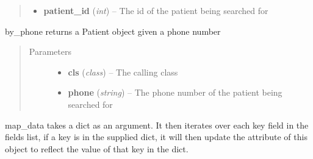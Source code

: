 \documentclass[letterpaper,10pt,english]{sphinxmanual}
\begin{document}
\begin{fulllineitems}
\begin{fulllineitems}
\begin{quote}
\begin{description}
\begin{itemize}
\item {} 
\textbf{patient\_id} (\emph{int}) -- The id of the patient being searched for

\end{itemize}

\end{description}\end{quote}

\end{fulllineitems}


\begin{fulllineitems}
\label{dev-patients:cagenix.patients.models.Patient.by_phone}
by\_phone returns a Patient object given a phone number
\begin{quote}\begin{description}
\item[{Parameters}] \leavevmode\begin{itemize}
\item {} 
\textbf{cls} (\emph{class}) -- The calling class

\item {} 
\textbf{phone} (\emph{string}) -- The phone number of the patient being searched for

\end{itemize}

\end{description}\end{quote}

\end{fulllineitems}


\begin{fulllineitems}
\label{dev-patients:cagenix.patients.models.Patient.map_data}
map\_data takes a dict as an argument. It then iterates
over each key field in the fields list, if a key is
in the supplied dict, it will then update the attribute of
this object to reflect the value of that key in the dict.

\end{fulllineitems}


\end{fulllineitems}
\end{document}
